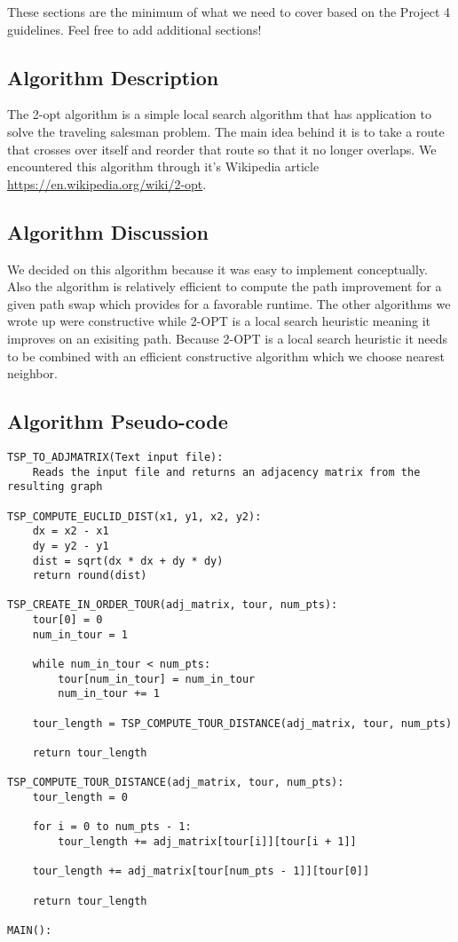\documentclass[../report/main.tex]{subfiles}
\begin{document}
These sections are the minimum of what we need to cover based on the Project 4 guidelines. Feel free to add additional sections!

\subsection*{Algorithm Description}

The 2-opt algorithm is a simple local search algorithm that has application to solve the traveling salesman problem. The main idea behind it is to take a route that crosses over itself and reorder that route so that it no longer overlaps. We encountered this algorithm through it's Wikipedia article \url{https://en.wikipedia.org/wiki/2-opt}.

\subsection*{Algorithm Discussion}

We decided on this algorithm because it was easy to implement conceptually. Also the algorithm is relatively efficient to compute the path improvement for a given path swap which provides for a favorable runtime. The other algorithms we wrote up were constructive while 2-OPT is a local search heuristic meaning it improves on an exisiting path. Because 2-OPT is a local search heuristic it needs to be combined with an efficient constructive algorithm which we choose nearest neighbor.

\subsection*{Algorithm Pseudo-code}

\begin{verbatim}
TSP_TO_ADJMATRIX(Text input file):
    Reads the input file and returns an adjacency matrix from the resulting graph

TSP_COMPUTE_EUCLID_DIST(x1, y1, x2, y2):
    dx = x2 - x1
    dy = y2 - y1
    dist = sqrt(dx * dx + dy * dy)
    return round(dist)

TSP_CREATE_IN_ORDER_TOUR(adj_matrix, tour, num_pts):
    tour[0] = 0
    num_in_tour = 1

    while num_in_tour < num_pts:
        tour[num_in_tour] = num_in_tour
        num_in_tour += 1

    tour_length = TSP_COMPUTE_TOUR_DISTANCE(adj_matrix, tour, num_pts)

    return tour_length

TSP_COMPUTE_TOUR_DISTANCE(adj_matrix, tour, num_pts):
    tour_length = 0

    for i = 0 to num_pts - 1:
        tour_length += adj_matrix[tour[i]][tour[i + 1]]

    tour_length += adj_matrix[tour[num_pts - 1]][tour[0]]

    return tour_length

MAIN():
    
\end{verbatim}
\end{document}
